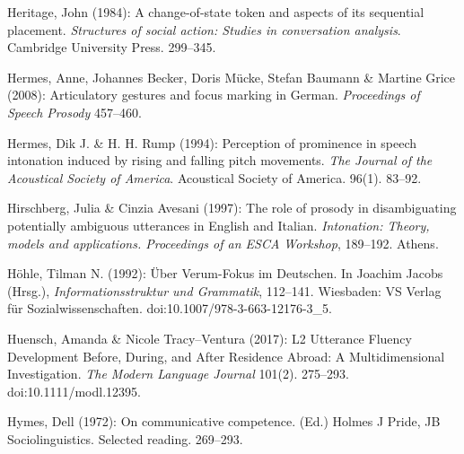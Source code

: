 \begin{styleBibliography}
Heritage, John (1984): A change-of-state token and aspects of its sequential placement. \textit{Structures of social action: Studies in conversation analysis}. Cambridge University Press. 299–345.
\end{styleBibliography}

\begin{styleBibliography}
Hermes, Anne, Johannes Becker, Doris Mücke, Stefan Baumann \& Martine Grice (2008): Articulatory gestures and focus marking in German. \textit{Proceedings of Speech Prosody} 457–460.
\end{styleBibliography}

\begin{styleBibliography}
Hermes, Dik J. \& H. H. Rump (1994): Perception of prominence in speech intonation induced by rising and falling pitch movements. \textit{The Journal of the Acoustical Society of America}. Acoustical Society of America. 96(1). 83–92.
\end{styleBibliography}

\begin{styleBibliography}
Hirschberg, Julia \& Cinzia Avesani (1997): The role of prosody in disambiguating potentially ambiguous utterances in English and Italian. \textit{Intonation: Theory, models and applications. Proceedings of an ESCA Workshop}, 189–192. Athens.
\end{styleBibliography}

\begin{styleBibliography}
Höhle, Tilman N. (1992): Über Verum-Fokus im Deutschen. In Joachim Jacobs (Hrsg.), \textit{Informationsstruktur und Grammatik}, 112–141. Wiesbaden: VS Verlag für Sozialwissenschaften. doi:10.1007/978-3-663-12176-3\_5.
\end{styleBibliography}

\begin{styleBibliography}
Huensch, Amanda \& Nicole Tracy–Ventura (2017): L2 Utterance Fluency Development Before, During, and After Residence Abroad: A Multidimensional Investigation. \textit{The Modern Language Journal} 101(2). 275–293. doi:10.1111/modl.12395.
\end{styleBibliography}

\begin{styleBibliography}
Hymes, Dell (1972): On communicative competence. (Ed.) Holmes J Pride, JB Sociolinguistics. Selected reading. 269–293.
\end{styleBibliography}


